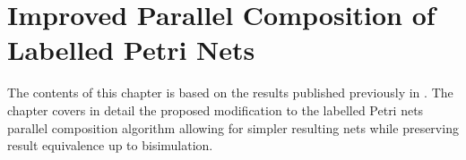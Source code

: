 \chapter{Improved Parallel Composition of Labelled Petri Nets}

\label{chap:ParComp}

The contents of this chapter is based on the results published previously in \cite{improved_par_comp}. The chapter covers in detail the proposed modification to the labelled Petri nets parallel composition algorithm allowing for simpler resulting nets while preserving result equivalence up to bisimulation.




